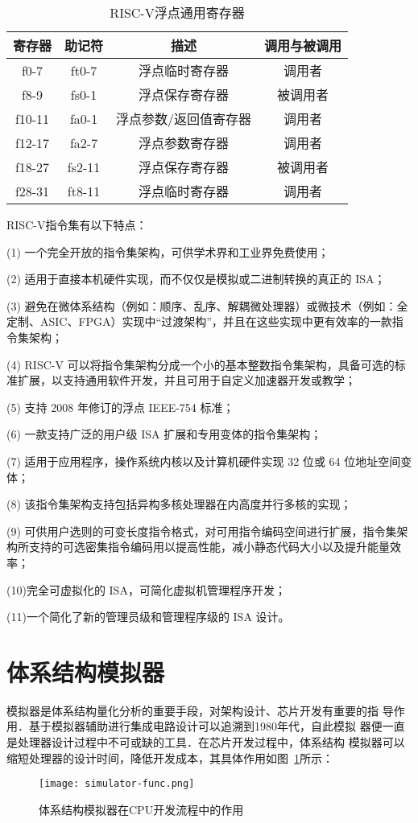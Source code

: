 \begin{table}[h]
  \centering
  \caption{RISC-V浮点通用寄存器}
  \label{tab:fpr}
  \begin{tabular}{cccc}
    \toprule
寄存器 &	助记符	& 描述 &	调用与被调用\\
    \midrule
    f0-7 & ft0-7 & 浮点临时寄存器 & 调用者\\
    f8-9 & fs0-1 & 浮点保存寄存器 & 被调用者\\
    f10-11 & fa0-1 & 浮点参数/返回值寄存器 & 调用者\\
    f12-17 & fa2-7 & 浮点参数寄存器 & 调用者\\
    f18-27 & fs2-11 & 浮点保存寄存器 & 被调用者\\
    f28-31 & ft8-11 & 浮点临时寄存器 & 调用者\\
    \bottomrule
  \end{tabular}
\end{table}


RISC-V指令集有以下特点：


(1) 一个完全开放的指令集架构，可供学术界和工业界免费使用；


(2) 适用于直接本机硬件实现，而不仅仅是模拟或二进制转换的真正的 ISA；


(3) 避免在微体系结构（例如：顺序、乱序、解耦微处理器）或微技术（例如：全定制、ASIC、FPGA）实现中“过渡架构”，并且在这些实现中更有效率的一款指令集架构；


(4) RISC-V 可以将指令集架构分成一个小的基本整数指令集架构，具备可选的标准扩展，以支持通用软件开发，并且可用于自定义加速器开发或教学；


(5) 支持 2008 年修订的浮点 IEEE-754 标准；


(6) 一款支持广泛的用户级 ISA 扩展和专用变体的指令集架构；


(7) 适用于应用程序，操作系统内核以及计算机硬件实现 32 位或 64 位地址空间变体；


(8) 该指令集架构支持包括异构多核处理器在内高度并行多核的实现；


(9) 可供用户选则的可变长度指令格式，对可用指令编码空间进行扩展，指令集架构所支持的可选密集指令编码用以提高性能，减小静态代码大小以及提升能量效率；


(10)完全可虚拟化的 ISA，可简化虚拟机管理程序开发；


(11)一个简化了新的管理员级和管理程序级的 ISA 设计。

\section{体系结构模拟器}
模拟器是体系结构量化分析的重要手段，对架构设计、芯片开发有重要的指
导作用．基于模拟器辅助进行集成电路设计可以追溯到1980年代，自此模拟
器便一直是处理器设计过程中不可或缺的工具．在芯片开发过程中，体系结构
模拟器可以缩短处理器的设计时间，降低开发成本，其具体作用如图~\ref{fig:sim-func}所示：
\begin{figure}[h]
  \centering
  \texttt{[image: simulator-func.png]}
  \caption{体系结构模拟器在CPU开发流程中的作用}
  \label{fig:sim-func}
\end{figure}


